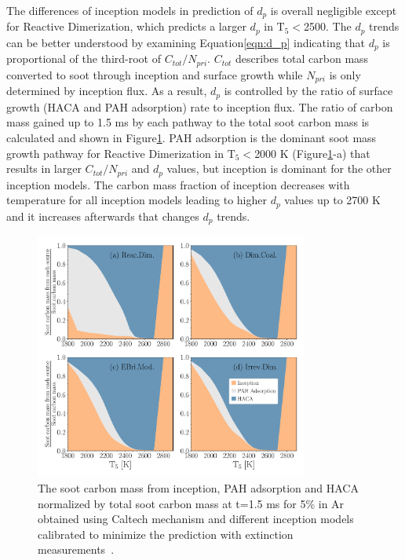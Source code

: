 The differences of inception models in prediction of $d_p$  is overall negligible except for Reactive Dimerization, which predicts a larger $d_p$ in $\mathrm{T_5}<$2500. The $d_p$ trends can be better understood by examining Equation\eqref{eqn:d_p} indicating that $d_p$ is proportional of the third-root of $C_{tot}/N_{pri}$. $C_{tot}$ describes total carbon mass converted to soot through inception and surface growth while $N_{pri}$ is only determined by inception flux. As a result, $d_p$ is controlled by the ratio of surface growth (HACA and PAH adsorption) rate to inception flux. The ratio of carbon mass gained up to 1.5 ms by each pathway to the total soot carbon mass is calculated and shown in Figure\ref{fig:shockagof_carbon_map_cpr}. PAH adsorption is the dominant soot mass growth pathway for Reactive Dimerization in $\mathrm{T_5}<$2000 K (Figure\ref{fig:shockagof_carbon_map_cpr}-a) that results in larger $C_{tot}/N_{pri}$ and $d_p$ values, but inception is dominant for the other inception models. The carbon mass fraction of inception decreases with temperature for all inception models leading to higher $d_p$ values up to 2700 K and it increases afterwards that changes $d_p$ trends.


\begin{figure}[H]
	\centering
	\includegraphics[width=0.8\textwidth]{Figures/Results/Shocktube/Agafonov2016_cpr/C_tot_distmap_5CH4.pdf}
	\caption{The soot carbon mass from inception, PAH adsorption and HACA normalized by total soot carbon mass at t=1.5 ms for 5\% in Ar obtained using Caltech mechanism and different inception models calibrated to minimize the prediction with extinction measurements~\citep{agafonov2016unified}.}
	\label{fig:shockagof_carbon_map_cpr} 
\end{figure}

